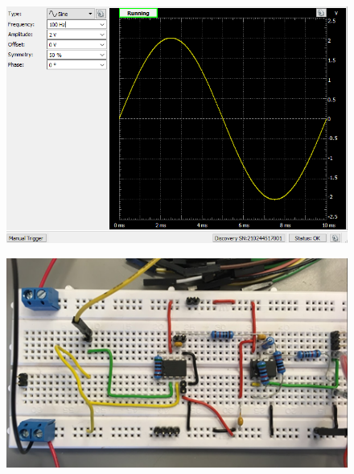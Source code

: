 \documentclass[main.tex]{subfiles}
\begin{document}
\begin{figure}[H]
\centering
\begin{minipage}{.5\textwidth}
  \centering
  \includegraphics[width=.9\linewidth]{Figure/VCCSwavegen1}
  \label{fig:test1}
\end{minipage}%
\begin{minipage}{.5\textwidth}
  \centering
  \includegraphics[width=.9\linewidth]{Figure/oprindeligekredslob}
  \label{fig:test2}
\end{minipage}
\end{figure}
\end{document}
